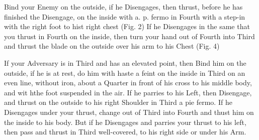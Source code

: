 \newpage


\newpage

Bind your Enemy on the outside, if he Disengages, then thrust, before
he has finished the Disengage, on the inside with a. p. fermo in
Fourth with a step-in with the right foot to hist right chest (Fig. 2)
If he Disengages in the same that you thrust in Fourth on the inside,
then turn your hand out of Fourth into Third and thrust the blade on
the outside over his arm to his Chest (Fig. 4)

If your Adversary is in Third and has an elevated point, then Bind him
on the outside, if he is at rest, do him with haste a feint on the
inside in Third on an even line, without iron, about a Quarter in
front of his cross to his middle body, and wit hthe foot suspended in the air. If he
parries to his Left, then Disengage, and thrust on the outside to his
right Shoulder in Third a pie fermo. If he Disengages under your
thrust, change out of Third into Fourth and thust him on the inside to
his body. But if he Disengages and parries your thrust to his left,
then pass and thrust in Third well-covered, to his right side or under
his Arm.

